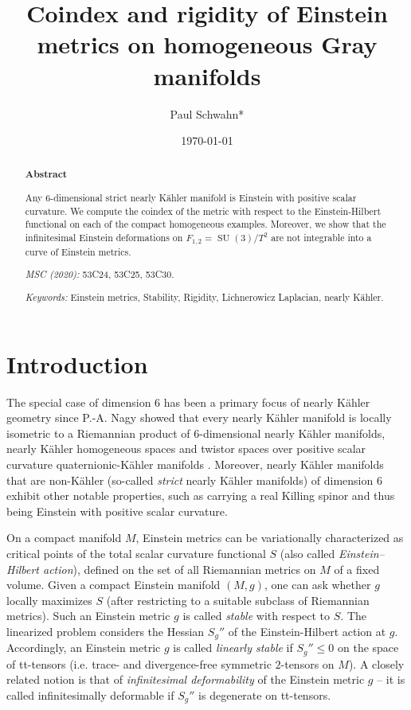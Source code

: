 \documentclass[12pt]{scrartcl}
\title{\rmfamily Coindex and rigidity of Einstein metrics on homogeneous Gray manifolds}%
\author{Paul Schwahn*}
\date{\today}
\theoremstyle{plain}
\theoremstyle{definition}
\newcommand{\SU}{\operatorname{SU}}%
\begin{document}
\maketitle
{\let\thefootnote\relax{}}

\begin{abstract}
\footnotesize
\begin{center}
\textbf{Abstract}
\end{center}

\noindent
Any $6$-dimensional strict nearly Kähler manifold is Einstein with positive scalar curvature. We compute the coindex of the metric with respect to the Einstein-Hilbert functional on each of the compact homogeneous examples. Moreover, we show that the infinitesimal Einstein deformations on $F_{1,2}=\SU(3)/T^2$ are not integrable into a curve of Einstein metrics.

\textit{MSC (2020):} 53C24, 53C25, 53C30.

\textit{Keywords:} Einstein metrics, Stability, Rigidity, Lichnerowicz Laplacian, nearly Kähler.
\end{abstract}

\section{Introduction}
\label{sec:intro}

The special case of dimension $6$ has been a primary focus of nearly Kähler geometry since P.-A. Nagy showed that every nearly Kähler manifold is locally isometric to a Riemannian product of $6$-dimensional nearly Kähler manifolds, nearly Kähler homogeneous spaces and twistor spaces over positive scalar curvature quaternionic-Kähler manifolds \cite{nagy}. Moreover, nearly Kähler manifolds that are non-Kähler (so-called \emph{strict} nearly Kähler manifolds) of dimension $6$ exhibit other notable properties, such as carrying a real Killing spinor and thus being Einstein with positive scalar curvature.

On a compact manifold $M$, Einstein metrics can be variationally characterized as critical points of the total scalar curvature functional $S$ (also called \emph{Einstein--Hilbert action}), defined on the set of all Riemannian metrics on $M$ of a fixed volume. Given a compact Einstein manifold $(M,g)$, one can ask whether $g$ locally maximizes $S$ (after restricting to a suitable subclass of Riemannian metrics). Such an Einstein metric $g$ is called \emph{stable} with respect to $S$. The linearized problem considers the Hessian $S_g''$ of the Einstein-Hilbert action at $g$. Accordingly, an Einstein metric $g$ is called \emph{linearly stable} if $S_g''\leq 0$ on the space of tt-tensors (i.e. trace- and divergence-free symmetric $2$-tensors on $M$). A closely related notion is that of \emph{infinitesimal deformability} of the Einstein metric $g$ -- it is called infinitesimally deformable if $S_g''$ is degenerate on tt-tensors.
\end{document}
